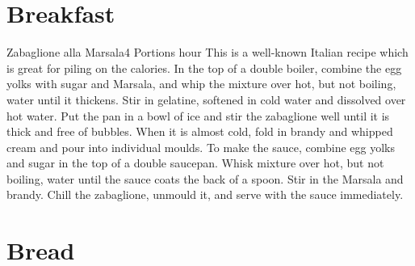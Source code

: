 \documentclass[letterpaper]{book}
\begin{document}
\pagestyle{empty}
\hbox{}\cleardoublepage
\pagestyle{plain}
\tableofcontents
\cleardoublepage
{}
\pagestyle{headings}


\chapter{Breakfast}

\begin{recipe}{Zabaglione alla Marsala}{4 Portions}{ hour}
\freeform This is a well-known Italian recipe which is
great for piling on the calories.
In the top of a double boiler, combine the egg yolks with sugar and
Marsala, and whip the mixture over hot, but not boiling, water until it
thickens. Stir in gelatine, softened in cold water and dissolved over hot
water.
Put the pan in a bowl of ice and stir the
zabaglione well until it is thick and free of bubbles. When it is almost
cold, fold in brandy and whipped cream and pour into individual moulds.
To make the sauce, combine egg yolks and sugar in the top of a double
saucepan. Whisk mixture over hot, but not boiling, water until the
sauce coats the back of a spoon. Stir in the Marsala and brandy.
\newstep
Chill the zabaglione, unmould it, and serve with the sauce immediately.
\end{recipe}\newpage

\chapter{Bread}



\clearpage
\hbox{}\clearpage\hbox{}\cleardoublepage
\end{document}
